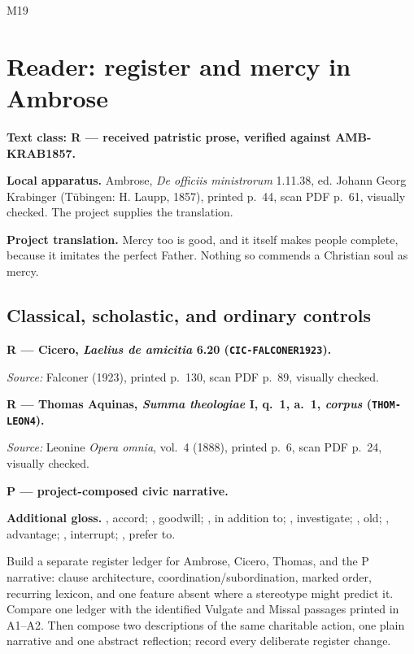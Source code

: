 \begin{courseunit}{M19}
\chapter{Reader: register and mercy in Ambrose}

\textbf{Text class: R --- received patristic prose, verified against
AMB-KRAB1857.}

\ReaderAmbroseMercy

\textbf{Local apparatus.} Ambrose, \textit{De officiis ministrorum} 1.11.38,
ed. Johann Georg Krabinger (Tübingen: H. Laupp, 1857), printed p.~44, scan PDF
p.~61, visually checked.  The project supplies the translation.

\textbf{Project translation.} Mercy too is good, and it itself makes people
complete, because it imitates the perfect Father. Nothing so commends a
Christian soul as mercy.

\section{Classical, scholastic, and ordinary controls}

\textbf{R --- Cicero, \textit{Laelius de amicitia} 6.20
(\texttt{CIC-FALCONER1923}).}

\ReaderCiceroFriendship

\emph{Source:} Falconer (1923), printed p.~130, scan PDF p.~89, visually
checked.

\textbf{R --- Thomas Aquinas, \textit{Summa theologiae} I, q.~1, a.~1,
\textit{corpus} (\texttt{THOM-LEON4}).}

\ReaderThomasDoctrine

\emph{Source:} Leonine \textit{Opera omnia}, vol.~4 (1888), printed p.~6,
scan PDF p.~24, visually checked.

\textbf{P --- project-composed civic narrative.}

\ReaderBridgeNarrative

\textbf{Additional gloss.} , accord;
, goodwill; , in addition to;
, investigate; , old;
, advantage; , interrupt;
, prefer to.

Build a separate register ledger for Ambrose, Cicero, Thomas, and the P
narrative: clause architecture, coordination/subordination, marked order,
recurring lexicon, and one feature absent where a stereotype might predict it.
Compare one ledger with the identified Vulgate and Missal passages printed in
A1--A2.  Then compose two descriptions of the same charitable action, one
plain narrative and one abstract reflection; record every deliberate register
change.


\end{courseunit}
